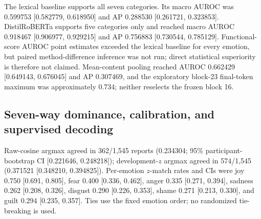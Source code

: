 The lexical baseline supports all seven categories. Its macro AUROC was 0.599753 [0.582779, 0.618950] and AP 0.288530 [0.261721, 0.323853]. DistilRoBERTa supports five categories only and reached macro AUROC 0.918467 [0.906977, 0.929215] and AP 0.756883 [0.730544, 0.785129]. Functional-score AUROC point estimates exceeded the lexical baseline for every emotion, but paired method-difference inference was not run; direct statistical superiority is therefore not claimed. Mean-content pooling reached AUROC 0.662429 [0.649143, 0.676045] and AP 0.307469, and the exploratory block-23 final-token maximum was approximately 0.734; neither reselects the frozen block 16.

\subsection{Seven-way dominance, calibration, and supervised decoding}
\label{app:dominance}

Raw-cosine argmax agreed in 362/1,545 reports (0.234304; 95\% participant-bootstrap CI [0.221646, 0.248218]); development-$z$ argmax agreed in 574/1,545 (0.371521 [0.348210, 0.394825]). Per-emotion $z$-match rates and CIs were joy 0.750 [0.691, 0.805], fear 0.400 [0.336, 0.462], anger 0.335 [0.271, 0.394], sadness 0.262 [0.208, 0.326], disgust 0.290 [0.226, 0.353], shame 0.271 [0.213, 0.330], and guilt 0.294 [0.235, 0.357]. Ties use the fixed emotion order; no randomized tie-breaking is used.

